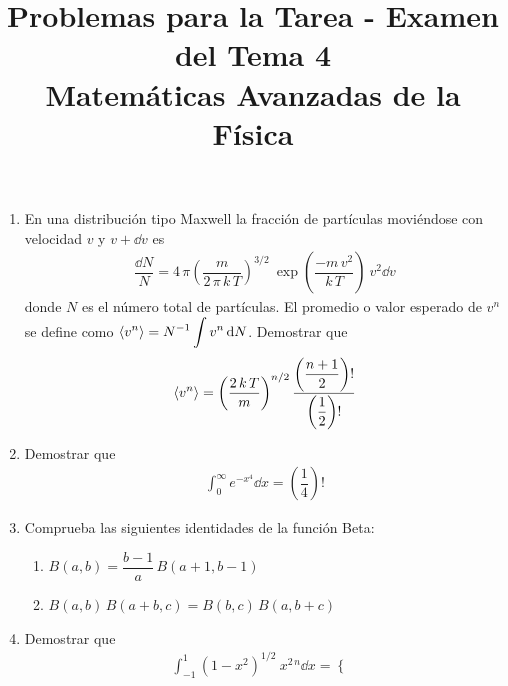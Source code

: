 
\title{Problemas para la Tarea - Examen del Tema 4 \\ \large{Matemáticas Avanzadas de la Física} \vspace{-1.5\baselineskip}}
\date{ }

\vspace{-4cm}
\renewcommand\labelenumii{\theenumi.{\arabic{enumii})}}
\maketitle
\fontsize{14}{14}\selectfont
\begin{enumerate}
\item En una distribución tipo Maxwell la fracción de partículas moviéndose con velocidad $v$ y $v +\dd{v}$ es
\begin{align*}
\dfrac{\dd{N}}{N} = 4 \, \pi \left( \dfrac{m}{2 \, \pi \, k \, T} \right)^{3/2} \: \exp \left( \dfrac{-m \, v^{2}}{k \, T} \right) \: v^{2} \dd{v}
\end{align*}
donde $N$ es el número total de partículas. El promedio o valor esperado de $v^{n}$ se define como $\displaystyle \expval{v^{n}} = N^{-1} \int v^{n} \dd{N}$. Demostrar que
\begin{align*}
\expval{v^{n}} = \left( \dfrac{2 \, k \, T}{m} \right)^{n/2} \dfrac{\left( \dfrac{n + 1}{2} \right) !} { \left( \dfrac{1}{2} \right) !}
\end{align*}
\item Demostrar que
\begin{align*}
\int_{0}^{\infty} e^{-x^{4}} \dd{x} = \left( \dfrac{1}{4} \right) !
\end{align*}
\item Comprueba las siguientes identidades de la función Beta:
\begin{enumerate}
\setlength{\itemsep}{15pt}
\item $B(a, b) = \dfrac{b - 1}{a} \, B (a + 1, b - 1)$
\item $B(a, b) \, B(a + b, c) = B(b, c) \, B(a, b + c)$
\end{enumerate}
\item Demostrar que
\begin{align*}
\int_{-1}^{1} (1-x^{2})^{1/2} \: x^{2 \, n} \dd{x} =  
\begin{cases}

\end{cases}
\end{align*}
\end{enumerate}
